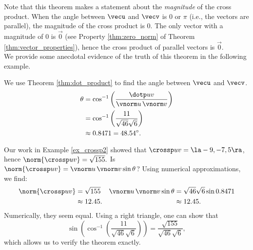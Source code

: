 Note that this theorem makes a statement about the \emph{magnitude} of the cross product. When the angle between $\vecu$ and $\vecv$ is 0 or $\pi$ (i.e., the vectors are parallel), the magnitude of the cross product is 0. The only vector with a magnitude of 0 is $\vec 0$ (see Property \ref{thm:zero_norm} of Theorem \ref{thm:vector_properties}), hence the cross product of  parallel vectors is $\vec 0$.\\

We provide some anecdotal evidence of the truth of this theorem in the following example.\\

{We use Theorem \ref{thm:dot_product} to find the angle between $\vecu$ and $\vecv$. 
\begin{align*}
\theta &= \cos^{-1}\left(\frac{\dotp uv}{\vnorm u\, \vnorm v}\right) \\
			&= \cos^{-1}\left(\frac{11}{\sqrt{46}\sqrt{6}}\right)\\
			&\approx 0.8471 = 48.54^\circ.
\end{align*}

Our work in Example \ref{ex_crossp2} showed that $\crossp uv = \la -9,-7,5\ra$, hence $\norm{\crossp uv} = \sqrt{155}.$ Is $\norm{\crossp uv} = \vnorm u\, \vnorm v\sin\theta$? Using numerical approximations, we find:
\begin{align*}
\norm{\crossp uv} &=\sqrt{155}  & \vnorm u\,\vnorm v \sin\theta & = \sqrt{46}\sqrt{6}\sin 0.8471\\
									&\approx 12.45. & &\approx 12.45.
\end{align*}
Numerically, they seem equal. Using a right triangle, one can show that 
\[
\sin\left(\cos^{-1}\left(\frac{11}{\sqrt{46}\sqrt{6}}\right)\right) = \frac{\sqrt{155}}{\sqrt{46}\sqrt{6}},
\]
which allows us to verify the theorem exactly.
}\\

